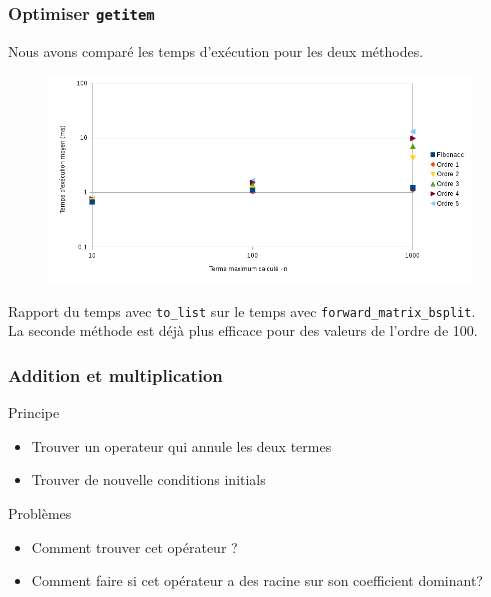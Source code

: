 \documentclass{beamer}
\newlength{\charwidth}
\newcommand{\uline}{\underline{\hspace{2\charwidth}}}
\begin{document}

\begin{frame}
\frametitle{Optimiser \texttt{\uline getitem \uline}}
\begin{center}
Nous avons comparé les temps d'exécution pour les deux méthodes.
\begin{figure}
    \includegraphics[scale=0.4]{graphe}
\end{figure}
{\scriptsize Rapport du temps avec \texttt{to\_list} sur le temps avec 
\texttt{forward\_matrix\_bsplit}.}\\
\vspace{1cm}
La seconde méthode est déjà plus efficace pour des valeurs de l'ordre de 100.
\end{center}
\end{frame}


\begin{frame}
\frametitle{Addition et multiplication}
\begin{center}
\begin{block}{Principe}
    \begin{itemize}
        \item Trouver un operateur qui annule les deux termes
        \item Trouver de nouvelle conditions initials
    \end{itemize}
\end{block}
\pause
\begin{alertblock}{Problèmes}
    \begin{itemize}
        \item Comment trouver cet opérateur ?
        \item Comment faire si cet opérateur a des racine sur son coefficient dominant?
    \end{itemize}
\end{alertblock}
\end{center}
\end{frame}
\end{document}
